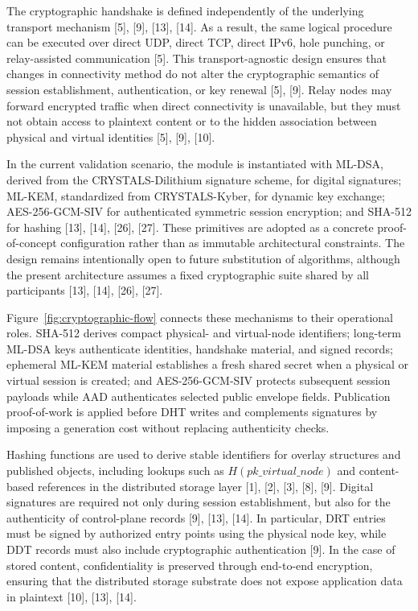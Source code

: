 \documentclass[12pt,a4paper]{article}
\begin{document}
The cryptographic handshake is defined independently of the underlying transport mechanism [5], [9], [13], [14]. As a result, the same logical procedure can be executed over direct UDP, direct TCP, direct IPv6, hole punching, or relay-assisted communication [5]. This transport-agnostic design ensures that changes in connectivity method do not alter the cryptographic semantics of session establishment, authentication, or key renewal [5], [9]. Relay nodes may forward encrypted traffic when direct connectivity is unavailable, but they must not obtain access to plaintext content or to the hidden association between physical and virtual identities [5], [9], [10].

In the current validation scenario, the module is instantiated with ML-DSA, derived from the CRYSTALS-Dilithium signature scheme, for digital signatures; ML-KEM, standardized from CRYSTALS-Kyber, for dynamic key exchange; AES-256-GCM-SIV for authenticated symmetric session encryption; and SHA-512 for hashing [13], [14], [26], [27]. These primitives are adopted as a concrete proof-of-concept configuration rather than as immutable architectural constraints. The design remains intentionally open to future substitution of algorithms, although the present architecture assumes a fixed cryptographic suite shared by all participants [13], [14], [26], [27].

Figure~\ref{fig:cryptographic-flow} connects these mechanisms to their operational roles. SHA-512 derives compact physical- and virtual-node identifiers; long-term ML-DSA keys authenticate identities, handshake material, and signed records; ephemeral ML-KEM material establishes a fresh shared secret when a physical or virtual session is created; and AES-256-GCM-SIV protects subsequent session payloads while AAD authenticates selected public envelope fields. Publication proof-of-work is applied before DHT writes and complements signatures by imposing a generation cost without replacing authenticity checks.

\thesiscryptographicflowtikz

Hashing functions are used to derive stable identifiers for overlay structures and published objects, including lookups such as \(H(pk\_virtual\_node)\) and content-based references in the distributed storage layer [1], [2], [3], [8], [9]. Digital signatures are required not only during session establishment, but also for the authenticity of control-plane records [9], [13], [14]. In particular, DRT entries must be signed by authorized entry points using the physical node key, while DDT records must also include cryptographic authentication [9]. In the case of stored content, confidentiality is preserved through end-to-end encryption, ensuring that the distributed storage substrate does not expose application data in plaintext [10], [13], [14].
\end{document}
